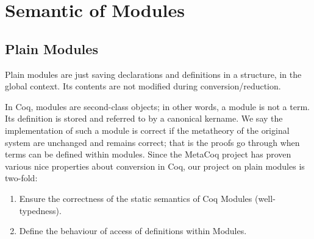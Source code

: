 
\section{Semantic of Modules}
\subsection{Plain Modules}
\label{sec:plainmodules}

Plain modules are just saving declarations and definitions in a structure, in the
global context. Its contents are not modified during conversion/reduction.

In Coq, modules are second-class objects; in other words, a module is not a
term.  Its definition is stored and referred to by a canonical kername. We say
the implementation of such a module is correct if the metatheory of the original
system are unchanged and remains correct; that is the proofs go through when
terms can be defined within modules. Since the MetaCoq project has proven
various nice properties about conversion in Coq, our project on plain modules is
two-fold:
\begin{enumerate}
\item Ensure the correctness of the static semantics of Coq Modules
(well-typedness).
\item Define the behaviour of access of definitions within Modules.
\end{enumerate}

